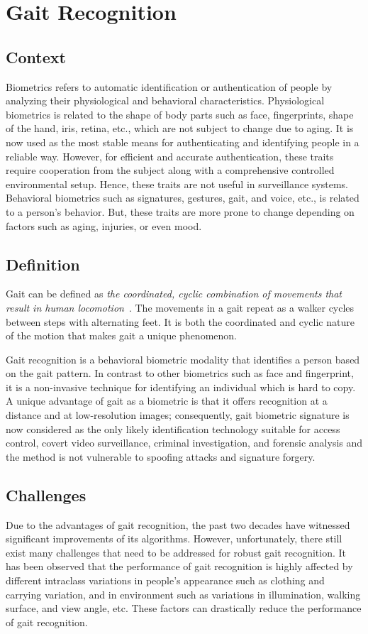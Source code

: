 \section{Gait Recognition}
\subsection{Context}
Biometrics refers to automatic identification or authentication of people by analyzing their physiological and behavioral characteristics. Physiological biometrics is related to the shape of body parts such as face, fingerprints, shape of the hand, iris, retina, etc., which are not subject to change due to aging. It is now used as the most stable means for authenticating and identifying people in a reliable way. However, for efficient and accurate authentication, these traits require cooperation from the subject along with a comprehensive controlled environmental setup. Hence, these traits are not useful in surveillance systems. Behavioral biometrics such as signatures, gestures, gait, and voice, etc., is related to a person’s behavior. But, these traits are more prone to change depending on factors such as aging, injuries, or even mood. 


\subsection{Definition}
Gait can be defined as \textit{the coordinated, cyclic combination of movements that result in human locomotion}~\cite{Boyd_05}. The movements in a gait repeat as a walker cycles between steps with alternating feet. It is both the coordinated and cyclic nature of the motion that makes gait a unique phenomenon.

Gait recognition is a behavioral biometric modality that identifies a person based on the gait pattern. In contrast to other biometrics such as face and fingerprint, it is a non-invasive technique for identifying an individual which is hard to copy. A unique advantage of gait as a biometric is that it offers recognition at a distance and at low-resolution images; consequently, gait biometric signature is now considered as the only likely identification technology suitable for access control, covert video surveillance, criminal investigation, and forensic analysis and the method is not vulnerable to spoofing attacks and signature forgery.


\subsection{Challenges}
Due to the advantages of gait recognition, the past two decades have witnessed significant improvements of its algorithms. However, unfortunately, there still exist many challenges that need to be addressed for robust gait recognition. It has been observed that the performance of gait recognition is highly affected by different intraclass variations in people's appearance such as clothing and carrying variation, and in environment such as variations in illumination, walking surface, and view angle, etc. These factors can drastically reduce the performance of gait recognition.  


